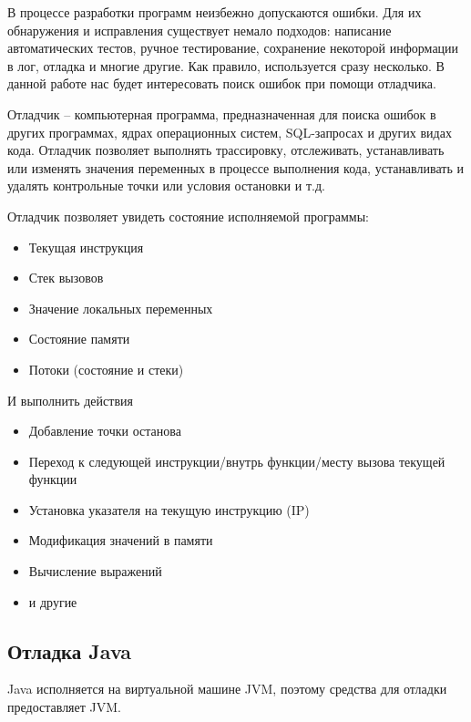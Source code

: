 В процессе разработки программ неизбежно допускаются ошибки. Для их обнаружения и исправления 
существует немало подходов: написание автоматических тестов, ручное тестирование, сохранение 
некоторой информации в лог, отладка и многие другие. Как правило, используется сразу несколько. 
В данной работе нас будет интересовать поиск ошибок при помощи отладчика.

\begin{definition}\label{debugger:definition}
	Отладчик --  компьютерная программа, предназначенная для поиска ошибок в других программах, ядрах операционных систем, SQL-запросах и других видах кода. Отладчик позволяет выполнять трассировку, отслеживать, устанавливать или изменять значения переменных в процессе выполнения кода, устанавливать и удалять контрольные точки или условия остановки и т.д.\cite{wiki:debugger}
\end{definition}

\noindent Отладчик позволяет увидеть состояние исполняемой программы:

\begin{itemize}
	\item Текущая инструкция
	\item Стек вызовов
	\item Значение локальных переменных
	\item Состояние памяти
	\item Потоки (состояние и стеки)
\end{itemize}

\noindent И выполнить действия

\begin{itemize}
	\item Добавление точки останова
	\item Переход к следующей инструкции/внутрь функции/месту вызова текущей функции
	\item Установка указателя на текущую инструкцию (IP)
	\item Модификация значений в памяти
	\item Вычисление выражений
	\item и другие
\end{itemize}

\subsection{Отладка Java}

Java исполняется на виртуальной машине JVM, поэтому средства для отладки предоставляет 
JVM.

